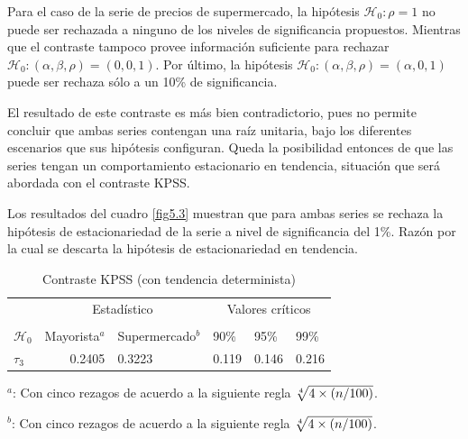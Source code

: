 \documentclass[12pt, twoside]{book}\usepackage[]{graphicx}\usepackage[]{color}
\numberwithin{equation}{section}
\numberwithin{theorem}{section}
\numberwithin{teorema}{section}
\numberwithin{defi}{section}
\numberwithin{prop}{section}
\numberwithin{defi}{section}
\theoremstyle{plain}
\begin{document}
Para el caso de la serie de precios de supermercado, la hipótesis $\mathcal{H}_{0}: \rho=1$ no puede ser rechazada a ninguno de los niveles de significancia propuestos. Mientras que el contraste tampoco provee información suficiente para rechazar $\mathcal{H}_{0}: (\alpha, \beta, \rho)=(0,0,1)$. Por último, la hipótesis $\mathcal{H}_{0}: (\alpha, \beta,\rho)=(\alpha,0,1)$ puede ser rechaza sólo a un 10\% de significancia. 

El resultado de este contraste es más bien contradictorio, pues no permite concluir que ambas series contengan una raíz unitaria, bajo los diferentes escenarios que sus hipótesis configuran. Queda la posibilidad entonces de que las series tengan un comportamiento estacionario en tendencia, situación que será abordada con el contraste KPSS. 

Los resultados del cuadro \ref{fig5.3}  muestran que para ambas series se rechaza la hipótesis de estacionariedad de la serie a nivel de significancia del 1\%. Razón por la cual se descarta la hipótesis de estacionariedad en tendencia. 

\begin{table}[!htpb]
\centering
\begin{threeparttable}
\caption{Contraste KPSS (con tendencia determinista) \label{fig5.3}}
\begin{tabular}{@{}lrllll@{}}
\toprule
\multicolumn{1}{l}{} & \multicolumn{2}{c}{Estadístico} &
\multicolumn{3}{c}{Valores críticos} \\
\cmidrule(l){2-3} \cmidrule(l){4-6} \\
\multicolumn{1}{l}{$\mathcal{H}_0$} & \multicolumn{1}{c}{Mayorista$^{a}$} &
 \multicolumn{1}{c}{Supermercado$^{b}$} &
\multicolumn{1}{l}{90\%}&
\multicolumn{1}{l}{95\%}&
\multicolumn{1}{l}{99\%}
\\
\midrule
$\tau_{3} $  & 0.2405 &  0.3223 & 0.119 & 0.146 & 0.216 \\
\bottomrule
\end{tabular}
\label{tab-6}
\begin{tablenotes}
\small 
\item $^{a}$: Con cinco rezagos de acuerdo a la siguiente regla $\root 4 \of {4 \times (n/100)}$. 
\item $^{b}$: Con cinco rezagos de acuerdo a la siguiente regla $\root 4 \of {4 \times (n/100)}$. 
\end{tablenotes}
\end{threeparttable}
\end{table}
\end{document}
